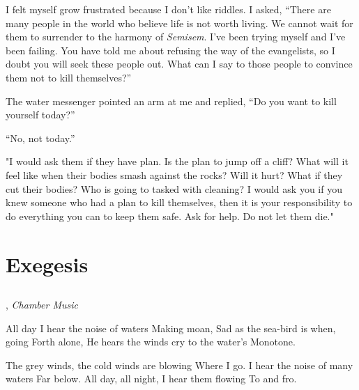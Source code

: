\documentclass[12pt, letterpaper]{report}
\begin{document}
\vspace{1\baselineskip}
I felt myself grow frustrated because I don't like riddles. I asked, ``There are many people in the world who believe life is not worth living. We cannot wait for them to surrender to the harmony of \textit{Semisem}. I've been trying myself and I've been failing. You have told me about refusing the way of the evangelists, so I doubt you will seek these people out. What can I say to those people to convince them not to kill themselves?''

\vspace{1\baselineskip}
The water messenger pointed an arm at me and replied, ``Do you want to kill yourself today?''

\vspace{1\baselineskip}
``No, not today.''

\vspace{1\baselineskip}
"I would ask them if they have plan. Is the plan to jump off a cliff? What will it feel like when their bodies smash against the rocks? Will it hurt? What if they cut their bodies? Who is going to tasked with cleaning? I would ask you if you knew someone who had a plan to kill themselves, then it is your responsibility to do everything you can to keep them safe. Ask for help. Do not let them die."

\part{Exegesis}

\chapter{}


\author{James Joyce}, \textit{Chamber Music}

\begin{poem}
\begin{stanza}
All day I hear the noise of waters\verseline
Making moan,\verseline
Sad as the sea-bird is when, going\verseline
Forth alone,\verseline
He hears the winds cry to the water’s\verseline
Monotone.
\end{stanza}
\begin{stanza}
The grey winds, the cold winds are blowing\verseline
Where I go.\verseline
I hear the noise of many waters\verseline
Far below.\verseline
All day, all night, I hear them flowing\verseline
To and fro.
\end{stanza}
\end{poem}
\end{document}
